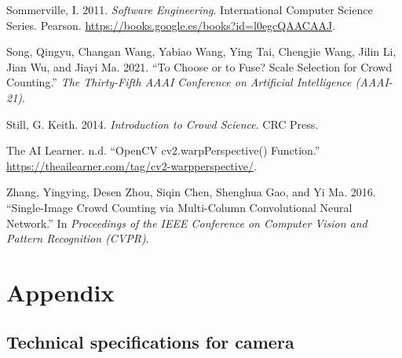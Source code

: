 \documentclass[
]{article}
\newlength{\cslhangindent}
\newlength{\cslentryspacingunit} %
\newenvironment{CSLReferences}[2] %
 {%
  \setlength{\parindent}{0pt}
  \ifodd #1
  \let\oldpar\par
  \def\par{\hangindent=\cslhangindent\oldpar}
  \fi
  \setlength{\parskip}{#2\cslentryspacingunit}
 }%
 {}
\begin{document}
\begin{CSLReferences}{1}{0}
\leavevmode{}%
Sommerville, I. 2011. \emph{Software Engineering}. International
Computer Science Series. Pearson.
\url{https://books.google.es/books?id=l0egcQAACAAJ}.

\leavevmode{}%
Song, Qingyu, Changan Wang, Yabiao Wang, Ying Tai, Chengjie Wang, Jilin
Li, Jian Wu, and Jiayi Ma. 2021. {``To Choose or to Fuse? Scale
Selection for Crowd Counting.''} \emph{The Thirty-Fifth AAAI Conference
on Artificial Intelligence (AAAI-21)}.

\leavevmode{}%
Still, G. Keith. 2014. \emph{Introduction to Crowd Science}. CRC Press.

\leavevmode{}%
The AI Learner. n.d. {``{OpenCV cv2.warpPerspective() Function}.''}
\url{https://theailearner.com/tag/cv2-warpperspective/}.

\leavevmode{}%
Zhang, Yingying, Desen Zhou, Siqin Chen, Shenghua Gao, and Yi Ma. 2016.
{``Single-Image Crowd Counting via Multi-Column Convolutional Neural
Network.''} In \emph{Proceedings of the IEEE Conference on Computer
Vision and Pattern Recognition (CVPR)}.

\end{CSLReferences}

\newpage{}

\hypertarget{sec-appendices}{%
\section{Appendix}\label{sec-appendices}}

\hypertarget{technical-specifications-for-camera}{%
\subsection*{Technical specifications for
camera}\label{technical-specifications-for-camera}}
\end{document}
